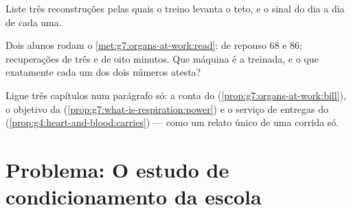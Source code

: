 \begin{exercise}[$\star\star$]\label{exo:g7:organs-at-work:10}
Liste três reconstruções pelas quais o treino levanta o teto, e o
sinal do dia a dia de cada uma.
\end{exercise}

\begin{exercise}[$\star\star$]\label{exo:g7:organs-at-work:11}
Dois alunos rodam o \cref{met:g7:organs-at-work:read}:  de
repouso $68$ e $86$; recuperações de três e de oito minutos. Que
máquina é a treinada, e o que exatamente cada um dos dois números
atesta?
\end{exercise}

\begin{exercise}[$\star\star\star$]\label{exo:g7:organs-at-work:12}
Ligue três capítulos num parágrafo só: a conta do 
(\cref{prop:g7:organs-at-work:bill}), o objetivo da 
(\cref{prop:g7:what-is-respiration:power}) e o serviço de entregas do
 (\cref{prop:g4:heart-and-blood:carries}) --- como um relato
único de uma corrida só.
\end{exercise}

\section{Problema: O estudo de condicionamento da escola}

